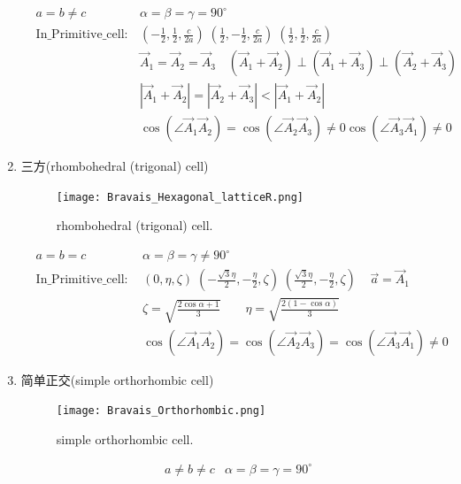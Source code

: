 \documentclass{article}      %
\begin{document}
\begin{enumerate}
\begin{figure}[h!]
\label{Bravais:tetragonal-body-centered}
\end{figure}
\begin{displaymath}
	\begin{aligned}
	&a=b\neq c & \alpha=\beta=\gamma=90^{\circ} \\
	&\mathrm{In\_Primitive\_cell}:&(-\frac12,\frac12,\frac{c}{2a})\;(\frac12,-\frac12,\frac{c}{2a})\;(\frac12,\frac12,\frac{c}{2a})\\
	& &\vec A_1=\vec A_2=\vec A_3\quad (\vec A_1+\vec A_2)\perp(\vec A_1+\vec A_3)\perp(\vec A_2+\vec A_3)\\
	& &|\vec A_1+\vec A_2|=|\vec A_2+\vec A_3|<|\vec A_1+\vec A_2|\\
		& &\cos(\angle\vec A_1\vec A_2)=\cos(\angle\vec A_2\vec A_3)\neq0\cos(\angle\vec A_3\vec A_1)\neq0
	\end{aligned}
\end{displaymath}
		\item 三方(\textrm{rhombohedral (trigonal) cell})
\begin{figure}[h!]
\centering
\texttt{[image: Bravais\_Hexagonal\_latticeR.png]}
\caption{\small rhombohedral (trigonal) cell.}%
\label{Bravais:rhombohedral cell}
\end{figure}
\begin{displaymath}
	\begin{aligned}
	& a=b=c &\alpha=\beta=\gamma\neq90^{\circ}\\
	&\mathrm{In\_Primitive\_cell}:~&(0,\eta,\zeta)\;(-\frac{\sqrt3\eta}2,-\frac{\eta}2,\zeta)\;(\frac{\sqrt3\eta}2,-\frac{\eta}2,\zeta)\;\;\;\;\vec a=\vec A_1\\
	&&\zeta=\sqrt{\frac{2\cos\alpha+1}3}\qquad \eta=\sqrt{\frac{2(1-\cos\alpha)}3}\\
		& & \cos(\angle\vec A_1\vec A_2)=\cos(\angle\vec A_2\vec A_3)=\cos(\angle\vec A_3\vec A_1)\neq 0
	\end{aligned}
\end{displaymath}
		\item 简单正交(\textrm{simple orthorhombic cell})
\begin{figure}[h!]
\centering
\texttt{[image: Bravais\_Orthorhombic.png]}
\caption{\small simple orthorhombic cell.}%
\label{Bravais:orthorhombic cell}
\end{figure}
\begin{displaymath}
	\begin{aligned}
	&a\neq b\neq c &\alpha=\beta=\gamma=90^{\circ} \\

\end{aligned}
\end{displaymath}
\end{enumerate}
\end{document}

